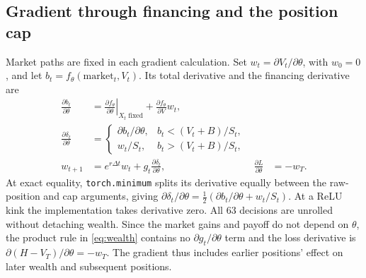 \documentclass[11pt,a4paper]{article}
\newcommand{\dt}{\Delta t}
\theoremstyle{remark}
\begin{document}
\subsection{Gradient through financing and the position cap}
Market paths are fixed in each gradient calculation. Set $w_t=\partial V_t/\partial\theta$, with $w_0=0$, and let $b_t=f_\theta(\mathrm{market}_t,V_t)$. Its total derivative and the financing derivative are
\begin{align}
 \frac{\partial b_t}{\partial\theta}
 &=\left.\frac{\partial f_\theta}{\partial\theta}\right|_{X_t\;\mathrm{fixed}}
      +\frac{\partial f_\theta}{\partial V}w_t,\nonumber\\
 \frac{\partial\delta_t}{\partial\theta}
 &=\begin{cases}
      \partial b_t/\partial\theta,& b_t<(V_t+B)/S_t,\\
      w_t/S_t,& b_t>(V_t+B)/S_t,
    \end{cases}\label{eq:capgradient}\\
 w_{t+1}&=e^{r\dt}w_t+g_t\frac{\partial\delta_t}{\partial\theta},
 &\frac{\partial L}{\partial\theta}&=-w_T.
 \label{eq:wealthgradient}
\end{align}
At exact equality, \texttt{torch.minimum} splits its derivative equally between the raw-position and cap arguments, giving
$\partial\delta_t/\partial\theta
=\tfrac12(\partial b_t/\partial\theta+w_t/S_t)$.
At a ReLU kink the implementation takes derivative zero. All 63 decisions are unrolled without detaching wealth. Since the market gains and payoff do not depend on $\theta$, the product rule in \eqref{eq:wealth} contains no $\partial g_t/\partial\theta$ term and the loss derivative is $\partial(H-V_T)/\partial\theta=-w_T$. The gradient thus includes earlier positions' effect on later wealth and subsequent positions.
\end{document}
